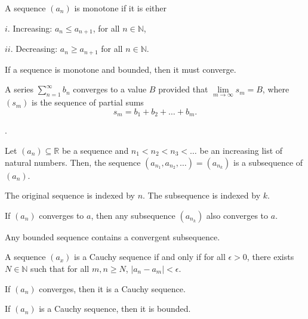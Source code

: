 \documentclass{article}
\begin{document}
\medskip
{}

    A sequence $(a_n)$ is monotone if it is either
    
    $i$. Increasing: $a_n \leq a_{n+1}$, for all $n \in \mathbb N$,
    
    $ii$. Decreasing: $a_n \geq a_{n+1}$ for all $n \in \mathbb N$.
    
\medskip
{}

    If a sequence is monotone and bounded, then it must converge.
    
\newpage
{}
    
    A series $\sum\limits_{n=1}^\infty b_n$ converges to a value $B$ provided that $\lim\limits_{m\to\infty} s_m = B$, where $(s_m)$ is the sequence of partial sums $$s_m = b_1 + b_2 + \hdots + b_m.$$
    
\medskip
{}.

\medskip
{}

    Let $(a_n) \subseteq \mathbb R$ be a sequence and $n_1 < n_2 < n_3 < \hdots$ be an increasing list of natural numbers. Then, the sequence $(a_{n_1},a_{n_2}, \hdots) = (a_{n_k})$ is a subsequence of $(a_n)$.
    
    The original sequence is indexed by $n$. The subsequence is indexed by $k$.
    
\medskip
{}

    If $(a_n)$ converges to $a$, then any subsequence $(a_{n_k})$ also converges to $a$.

\medskip
{}

    Any bounded sequence contains a convergent subsequence.

\medskip
{}
    
    A sequence $(a_x)$ is a Cauchy sequence if and only if for all $\epsilon > 0$, there exists $N \in \mathbb N$ such that for all $m,n \geq N$,  $|a_n - a_m| < \epsilon$.

\medskip
{}

    If $(a_n)$ converges, then it is a Cauchy sequence.

\medskip
{}

    If $(a_n)$ is a Cauchy sequence, then it is bounded.
    
\medskip
{}
\end{document}
